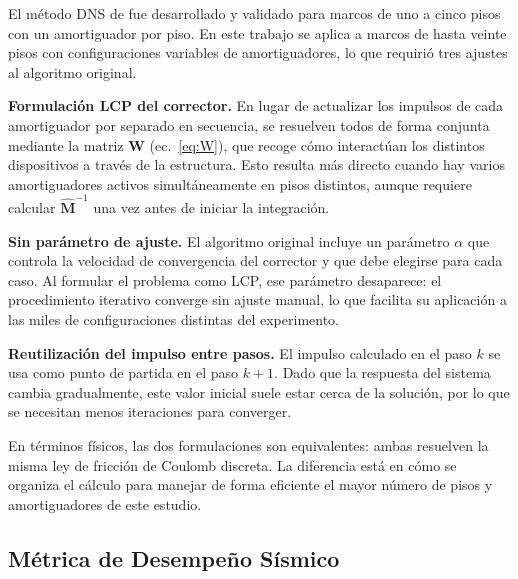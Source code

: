 \documentclass[preprint,12pt,authoryear]{elsarticle}
\begin{document}
El método DNS de \citet{Namorado2024} fue desarrollado y validado para marcos
de uno a cinco pisos con un amortiguador por piso. En este trabajo se aplica
a marcos de hasta veinte pisos con configuraciones variables de amortiguadores,
lo que requirió tres ajustes al algoritmo original.

\textbf{Formulación LCP del corrector.}
En lugar de actualizar los impulsos de cada amortiguador por separado en
secuencia, se resuelven todos de forma conjunta mediante la matriz $\bm{W}$
(ec.~\ref{eq:W}), que recoge cómo interactúan los distintos dispositivos a
través de la estructura. Esto resulta más directo cuando hay varios
amortiguadores activos simultáneamente en pisos distintos, aunque requiere
calcular $\hat{\bm{M}}^{-1}$ una vez antes de iniciar la integración.

\textbf{Sin parámetro de ajuste.}
El algoritmo original incluye un parámetro $\alpha$ que controla la velocidad
de convergencia del corrector y que debe elegirse para cada caso. Al formular
el problema como LCP, ese parámetro desaparece: el procedimiento iterativo
converge sin ajuste manual, lo que facilita su aplicación a las miles de
configuraciones distintas del experimento.

\textbf{Reutilización del impulso entre pasos.}
El impulso calculado en el paso $k$ se usa como punto de partida en el paso
$k+1$. Dado que la respuesta del sistema cambia gradualmente, este valor
inicial suele estar cerca de la solución, por lo que se necesitan menos
iteraciones para converger.

En términos físicos, las dos formulaciones son equivalentes: ambas resuelven
la misma ley de fricción de Coulomb discreta. La diferencia está en cómo se
organiza el cálculo para manejar de forma eficiente el mayor número de pisos
y amortiguadores de este estudio.

\subsection{Métrica de Desempeño Sísmico}
\label{sec:theory:metrica}
\end{document}
